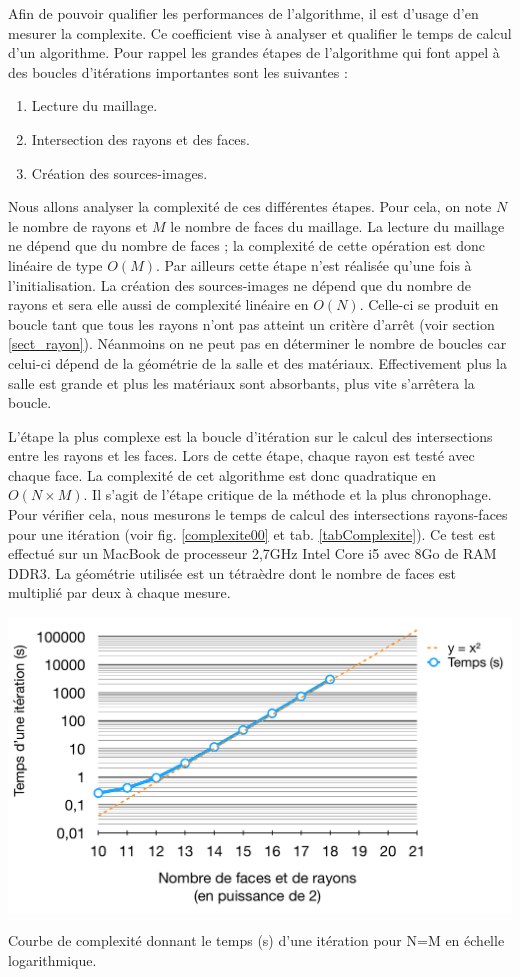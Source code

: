 Afin de pouvoir qualifier les performances de l'algorithme, il est d'usage d'en mesurer la \gls{complexite}. Ce coefficient vise à analyser et qualifier le temps de calcul d'un algorithme. Pour rappel les grandes étapes de l'algorithme qui font appel à des boucles d'itérations importantes sont les suivantes :
\begin{enumerate}
\item Lecture du maillage.
\item Intersection des rayons et des faces.
\item Création des sources-images.
\end{enumerate}
Nous allons analyser la complexité de ces différentes étapes. Pour cela, on note $N$ le nombre de rayons et $M$ le nombre de faces du maillage. La lecture du maillage ne dépend que du nombre de faces ; la complexité de cette opération est donc linéaire de type $O(M)$. Par ailleurs cette étape n'est réalisée qu'une fois à l'initialisation. La création des sources-images ne dépend que du nombre de rayons et sera elle aussi de complexité linéaire en $O(N)$. Celle-ci se produit en boucle tant que tous les rayons n'ont pas atteint un critère d'arrêt (voir section \ref{sect_rayon}). Néanmoins on ne peut pas en déterminer le nombre de boucles car celui-ci dépend de la géométrie de la salle et des matériaux. Effectivement plus la salle est grande et plus les matériaux sont absorbants, plus vite s'arrêtera la boucle. 

L'étape la plus complexe est la boucle d'itération sur le calcul des intersections entre les rayons et les faces. Lors de cette étape, chaque rayon est testé avec chaque face. La complexité de cet algorithme est donc quadratique en $O(N \times M)$. Il s'agit de l'étape critique de la méthode et la plus chronophage. Pour vérifier cela, nous mesurons le temps de calcul des intersections rayons-faces pour une itération (voir fig. \ref{complexite00} et tab. \ref{tabComplexite}). Ce test est effectué sur un MacBook de processeur 2,7GHz Intel Core i5 avec 8Go de RAM DDR3. La géométrie utilisée est un tétraèdre dont le nombre de faces est multiplié par deux à chaque mesure.


 \begin{figureth}
	\includegraphics[width=0.8\linewidth]{images/complexite00}
	\caption{Courbe de complexité donnant le temps (s) d'une itération pour N=M en échelle logarithmique.}
	\label{complexite00}
\end{figureth}

